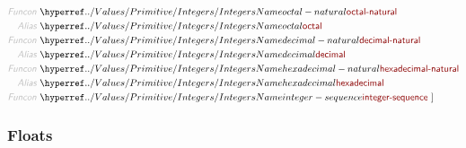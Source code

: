 \begin{align*}
  \KEY{Funcon} ~ & \NAMEHYPER{../Values/Primitive}{Integers}{octal-natural} \\
  \KEY{Alias} ~ & \NAMEHYPER{../Values/Primitive}{Integers}{octal} \\
  \KEY{Funcon} ~ & \NAMEHYPER{../Values/Primitive}{Integers}{decimal-natural} \\
  \KEY{Alias} ~ & \NAMEHYPER{../Values/Primitive}{Integers}{decimal} \\
  \KEY{Funcon} ~ & \NAMEHYPER{../Values/Primitive}{Integers}{hexadecimal-natural} \\
  \KEY{Alias} ~ & \NAMEHYPER{../Values/Primitive}{Integers}{hexadecimal} \\
  \KEY{Funcon} ~ & \NAMEHYPER{../Values/Primitive}{Integers}{integer-sequence}
  ~ ]
\end{align*}
\subsubsection*{Floats}\hypertarget{floats}{}\label{floats}


